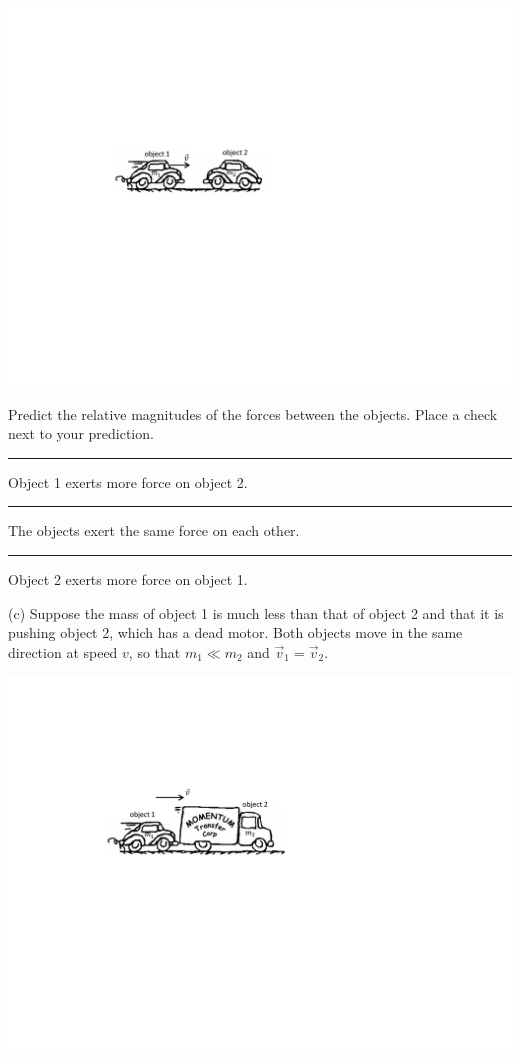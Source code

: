 {\par\centering \includegraphics{newtons_laws/newtons_laws_fig2_new.pdf} \par}

\leftskip=1cm

Predict the relative magnitudes of the forces between the objects.
Place a check next to your prediction.

\rule{0.5in}{0.1pt} Object 1 exerts more force on object 2. 

\rule{0.5in}{0.1pt} The objects exert the same force on each other.

\rule{0.5in}{0.1pt} Object 2 exerts more force on object 1.

\leftskip=0cm

\bigskip
(c) Suppose the mass of object 1 is much less than that of object 2 and that
it is pushing object 2, which has a dead motor.  Both objects move in the
same direction at speed $v$, so that
$m_{1}\ll m_{2}$ and
${\vec  v}_1={\vec  v}_2$.


{\par\centering \includegraphics{newtons_laws/newtons_laws_fig3_new.pdf} \par}

